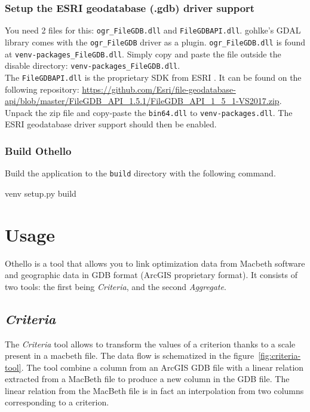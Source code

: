 \documentclass[11pt]{article}
\begin{document}
\subsubsection{Setup the ESRI geodatabase (.gdb) driver support}
\noindent You need 2 files for this: \texttt{ogr\_FileGDB.dll} and \texttt{FileGDBAPI.dll}.
gohlke's GDAL library comes with the \texttt{ogr\_FileGDB} driver as a plugin.
\texttt{ogr\_FileGDB.dll} is found at \texttt{venv\Lib\site-packages\osgeo\gdalplugins\disable\ogr\_FileGDB.dll}.
Simply copy and paste the file outside the disable directory: \texttt{venv\Lib\site-packages\osgeo\gdalplugins\ogr\_FileGDB.dll}. \\


\noindent The \texttt{FileGDBAPI.dll} is the proprietary SDK from ESRI .
It can be found on the following repository: \url{https://github.com/Esri/file-geodatabase-api/blob/master/FileGDB_API_1.5.1/FileGDB_API_1_5_1-VS2017.zip}.
Unpack the zip file and copy-paste the \texttt{bin64\FileGDPAPI.dll} to \texttt{venv\Lib\site-packages\osgeo\FileGDPAPI.dll}.
The ESRI geodatabase driver support should then be enabled.

\subsubsection{Build Othello}
\noindent Build the application to the \texttt{build} directory with the following command.
\begin{code}
venv\Scripts{} setup.py build
\end{code}


\newpage
\section{Usage}\label{sec:usage}
Othello is a tool that allows you to link optimization data from Macbeth software
and geographic data in GDB format (ArcGIS proprietary format).
It consists of two tools: the first being \textit{Criteria}, and the second \textit{Aggregate}.

\subsection{\textit{Criteria}}\label{subsec:criteria}
The \textit{Criteria} tool allows to transform the values of a criterion thanks
to a scale present in a macbeth file.
The data flow is schematized in the figure\ \ref{fig:criteria-tool}.
The tool combine a column from an ArcGIS GDB file
with a linear relation extracted from a MacBeth file to produce
a new column in the GDB file.
The linear relation from the MacBeth file is in fact an interpolation
from two columns corresponding to a criterion.
\end{document}
